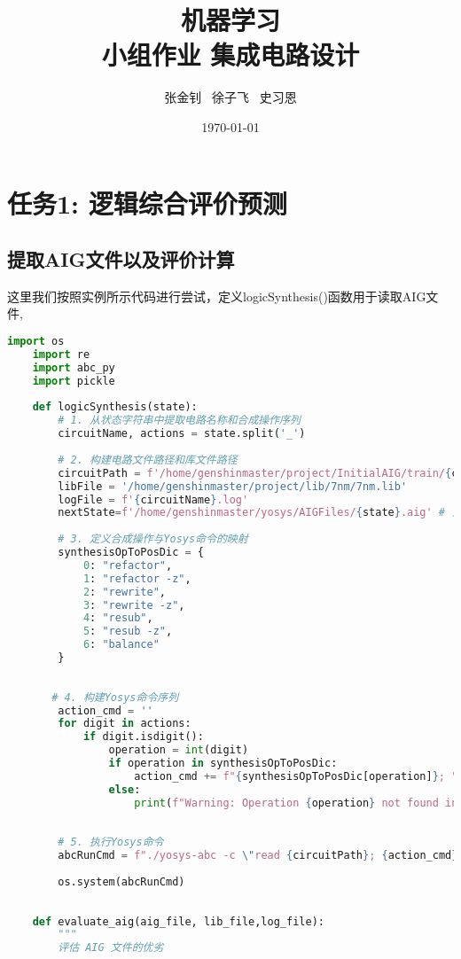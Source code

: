 \documentclass[UTF8]{ctexart}
\title{机器学习\\小组作业 集成电路设计}
\author{张金钊 \ 徐子飞 \ 史习恩}
\date{\today}
\begin{document}
\maketitle
\thispagestyle{empty}
 
\tableofcontents
\section{任务1: 逻辑综合评价预测}
\subsection{提取AIG文件以及评价计算}
这里我们按照实例所示代码进行尝试，定义logicSynthesis()函数用于读取AIG文件,
\begin{lstlisting}[language=python]
    import os
    import re
    import abc_py
    import pickle
    
    def logicSynthesis(state):
        # 1. 从状态字符串中提取电路名称和合成操作序列
        circuitName, actions = state.split('_')
        
        # 2. 构建电路文件路径和库文件路径
        circuitPath = f'/home/genshinmaster/project/InitialAIG/train/{circuitName}.aig'
        libFile = '/home/genshinmaster/project/lib/7nm/7nm.lib'
        logFile = f'{circuitName}.log'
        nextState=f'/home/genshinmaster/yosys/AIGFiles/{state}.aig' # 当前AIG文件
        
        # 3. 定义合成操作与Yosys命令的映射
        synthesisOpToPosDic = {
            0: "refactor",
            1: "refactor -z",
            2: "rewrite",
            3: "rewrite -z",
            4: "resub",
            5: "resub -z",
            6: "balance"
        }
        
      
       # 4. 构建Yosys命令序列
        action_cmd = ''
        for digit in actions:
            if digit.isdigit():
                operation = int(digit)
                if operation in synthesisOpToPosDic:
                    action_cmd += f"{synthesisOpToPosDic[operation]}; "
                else:
                    print(f"Warning: Operation {operation} not found in the dictionary.")
        
        
        # 5. 执行Yosys命令
        abcRunCmd = f"./yosys-abc -c \"read {circuitPath}; {action_cmd}; read_lib {libFile}; write {nextState}; print_stats\" > {logFile}"
        
        os.system(abcRunCmd)
         
    
    def evaluate_aig(aig_file, lib_file,log_file):
        """
        评估 AIG 文件的优劣
        

\end{lstlisting}
\end{document}

